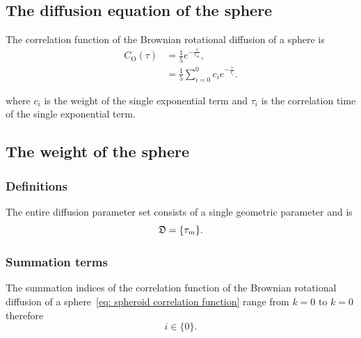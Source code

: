 



\subsection{The diffusion equation of the sphere} \label{sphere equation}

The correlation function of the Brownian rotational diffusion of a sphere is
\begin{align} \label{eq: spherical correlation function}
    C_\mathrm{O}(\tau) &= \frac{1}{5} e^{-\frac{\tau}{\tau_m}}, \\
              &= \frac{1}{5} \sum^0_{i=0} c_i e^{-\frac{\tau}{\tau_i}}.
\end{align}

\noindent where $c_i$ is the weight of the single exponential term and $\tau_i$ is the correlation time of the single exponential term.




\subsection{The weight of the sphere}


\subsubsection{Definitions}

The entire diffusion parameter set consists of a single geometric parameter and is
\begin{equation}
    \mathfrak{D} = \{ \tau_m \}.
\end{equation}



\subsubsection{Summation terms}

The summation indices of the correlation function of the Brownian rotational diffusion of a sphere~\eqref{eq: spheroid correlation function} range from $k = 0$ to $k = 0$ therefore
\begin{equation}
    i \in \{ 0 \}.
\end{equation}


